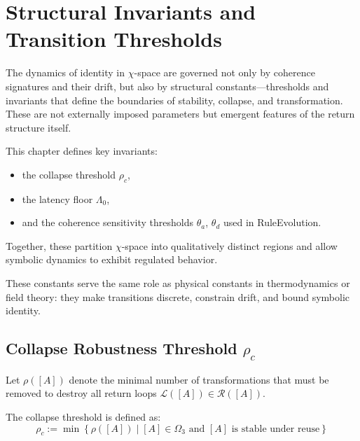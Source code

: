 \chapter{Structural Invariants and Transition Thresholds} \label{chapter-6-structural-invariants-and-thresholds}

The dynamics of identity in $\chi$-space are governed not only by coherence signatures and their drift, but also by structural constants—thresholds and invariants that define the boundaries of stability, collapse, and transformation. These are not externally imposed parameters but emergent features of the return structure itself.

\medskip

This chapter defines key invariants:
\begin{itemize}
    \item the collapse threshold $\rho_c$,
    \item the latency floor $\Lambda_0$,
    \item and the coherence sensitivity thresholds $\theta_a$, $\theta_d$ used in RuleEvolution.
\end{itemize}

Together, these partition $\chi$-space into qualitatively distinct regions and allow symbolic dynamics to exhibit regulated behavior.

\medskip

These constants serve the same role as physical constants in thermodynamics or field theory: they make transitions discrete, constrain drift, and bound symbolic identity.

\section{Collapse Robustness Threshold $\rho_c$} \label{collapse-robustness-threshold-rho_c}

Let $\rho([A])$ denote the minimal number of transformations that must be removed to destroy all return loops $\mathcal{L}([A]) \in \mathcal{R}([A])$.

\begin{definition}
The collapse threshold is defined as:
\begin{equation} \label{eq:rho_c-definition}
\rho_c := \min \left\{ \rho([A]) \mid [A] \in \Omega_3 \text{ and } [A] \text{ is stable under reuse} \right\}
\end{equation}
\end{definition}

